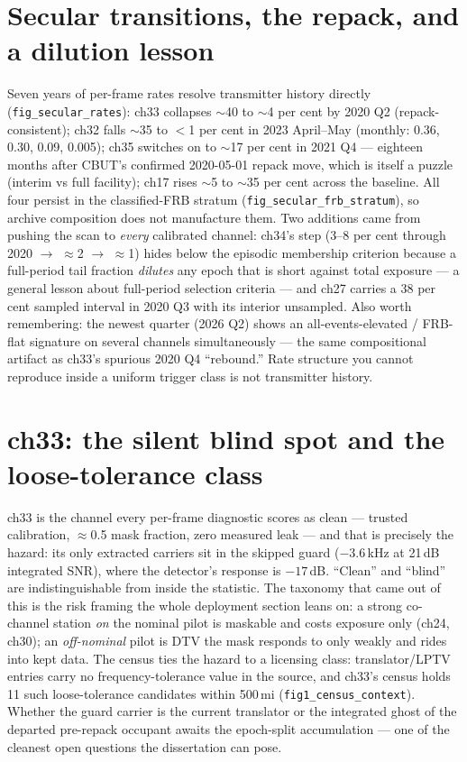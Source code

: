 \documentclass[10pt]{article}
\begin{document}
\section{Secular transitions, the repack, and a dilution lesson}
Seven years of per-frame rates resolve transmitter history directly
(\texttt{fig\_secular\_rates}): ch33 collapses $\sim$40 to $\sim$4 per
cent by 2020 Q2 (repack-consistent); ch32 falls $\sim$35 to $<$1 per
cent in 2023 April--May (monthly: 0.36, 0.30, 0.09, 0.005); ch35
switches on to $\sim$17 per cent in 2021 Q4 --- eighteen months after
CBUT's confirmed 2020-05-01 repack move, which is itself a puzzle
(interim vs full facility); ch17 rises $\sim$5 to $\sim$35 per cent
across the baseline. All four persist in the classified-FRB stratum
(\texttt{fig\_secular\_frb\_stratum}), so archive composition does not
manufacture them. Two additions came from pushing the scan to
\emph{every} calibrated channel: ch34's step (3--8 per cent through
2020 $\rightarrow$ $\approx$2 $\rightarrow$ $\approx$1) hides below
the episodic membership criterion because a full-period tail fraction
\emph{dilutes} any epoch that is short against total exposure --- a
general lesson about full-period selection criteria --- and ch27
carries a 38 per cent sampled interval in 2020 Q3 with its interior
unsampled. Also worth remembering: the newest quarter (2026 Q2) shows
an all-events-elevated / FRB-flat signature on several channels
simultaneously --- the same compositional artifact as ch33's spurious
2020 Q4 ``rebound.'' Rate structure you cannot reproduce inside a
uniform trigger class is not transmitter history.

\section{ch33: the silent blind spot and the loose-tolerance class}
\label{s:ch33}
ch33 is the channel every per-frame diagnostic scores as clean ---
trusted calibration, $\approx$0.5 mask fraction, zero measured leak
--- and that is precisely the hazard: its only extracted carriers sit
in the skipped guard ($-3.6$\,kHz at 21\,dB integrated SNR), where the
detector's response is $-17$\,dB. ``Clean'' and ``blind'' are
indistinguishable from inside the statistic. The taxonomy that came
out of this is the risk framing the whole deployment section leans
on: a strong co-channel station \emph{on} the nominal pilot is
maskable and costs exposure only (ch24, ch30); an \emph{off-nominal}
pilot is DTV the mask responds to only weakly and rides into kept
data. The census ties the hazard to a licensing class: translator/LPTV
entries carry no frequency-tolerance value in the source, and ch33's
census holds 11 such loose-tolerance candidates within 500\,mi
(\texttt{fig1\_census\_context}). Whether the guard carrier is the
current translator or the integrated ghost of the departed pre-repack
occupant awaits the epoch-split accumulation --- one of the cleanest
open questions the dissertation can pose.
\end{document}
